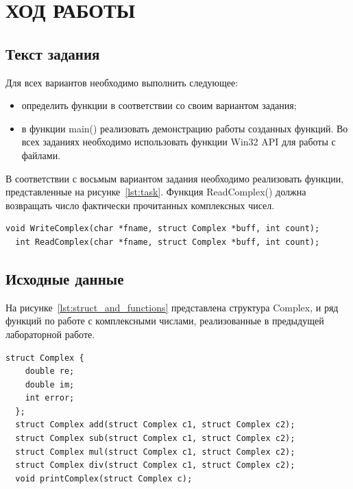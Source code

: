 \section{ХОД РАБОТЫ}

\subsection{Текст задания}

Для всех вариантов необходимо выполнить следующее:

\begin{itemize}

  \item определить функции в соответствии со своим вариантом задания;
  \item в функции main() реализовать демонстрацию работы созданных функций. Во всех заданиях необходимо использовать функции Win32 API для работы с файлами.

\end{itemize}

В соответствии с восьмым вариантом задания необходимо реализовать функции, представленные на рисунке~\ref{lst:task}. Функция ReadComplex() должна возвращать число фактически прочитанных комплексных чисел.

\begin{lstlisting}[caption=Функции для чтения и записи в файл,label=lst:task]
  void WriteComplex(char *fname, struct Complex *buff, int count);
  int ReadComplex(char *fname, struct Complex *buff, int count);
\end{lstlisting}

\subsection{Исходные данные}

На рисунке~\ref{lst:struct_and_functions} представлена структура Complex, и ряд функций по работе с комплексными числами, реализованные в предыдущей лабораторной работе.

\begin{lstlisting}[caption=Структура Complex и объявление функций для работы с комплексными числами,label=lst:struct_and_functions]
  struct Complex {
    double re;
    double im;
    int error;
  };
  struct Complex add(struct Complex c1, struct Complex c2);
  struct Complex sub(struct Complex c1, struct Complex c2);
  struct Complex mul(struct Complex c1, struct Complex c2);
  struct Complex div(struct Complex c1, struct Complex c2);
  void printComplex(struct Complex c);
\end{lstlisting}

